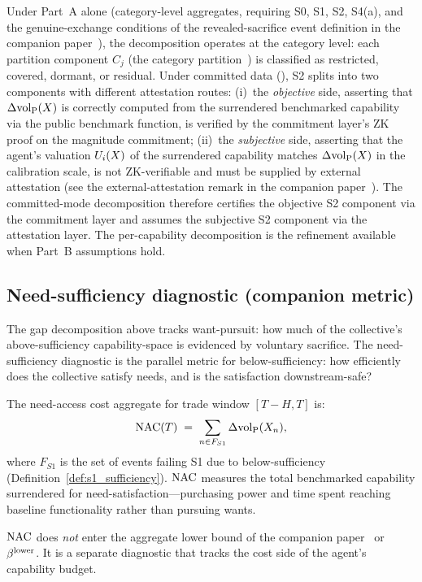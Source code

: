 \begin{remark}
Under Part~A alone (category-level aggregates, requiring S0,
S1, S2, S4(a), and the genuine-exchange conditions of the
revealed-sacrifice event definition in the companion
paper~\citep[Revealed~Sacrifice]{lasser2026paper8a}), the
decomposition operates at the category level: each partition
component $C_j$
(the category partition~\citep[Revealed~Sacrifice]{lasser2026paper8a}) is classified as
restricted, covered, dormant, or residual.  Under committed data
(\citep[Revealed~Sacrifice]{lasser2026paper8a}), S2 splits into
two components with different attestation routes: (i)~the
\emph{objective} side, asserting that $\Delta{\operatorname{vol}_{\mathrm{P}}}(X)$ is
correctly computed from the surrendered benchmarked capability
via the public benchmark function, is verified by the commitment
layer's ZK proof on the magnitude commitment; (ii)~the
\emph{subjective} side, asserting that the agent's valuation
$U_i(X)$ of the surrendered capability matches $\Delta{\operatorname{vol}_{\mathrm{P}}}(X)$
in the calibration scale, is not ZK-verifiable and must be
supplied by external attestation
(see the external-attestation remark in the companion
paper~\citep[Revealed~Sacrifice]{lasser2026paper8a}).
The committed-mode decomposition therefore certifies the
objective S2 component via the commitment layer and assumes the
subjective S2 component via the attestation layer.  The
per-capability decomposition is
the refinement available when Part~B assumptions hold.
\end{remark}

\subsection{Need-sufficiency diagnostic (companion metric)}
\label{sec:need_diagnostic}

The gap decomposition above tracks want-pursuit: how much of the
collective's above-sufficiency capability-space is evidenced by
voluntary sacrifice.  The need-sufficiency diagnostic is the
parallel metric for below-sufficiency: how efficiently does the
collective satisfy needs, and is the satisfaction downstream-safe?

\begin{definition}
\label{def:nac}
The need-access cost aggregate for trade window $[T - H, T]$ is:
\[
  \mathrm{NAC}(T) \;=\; \sum_{n \in F_{S1}}
  \Delta{\operatorname{vol}_{\mathrm{P}}}(X_n),
\]
where $F_{S1}$ is the set of events failing S1 due to
below-sufficiency (Definition~\ref{def:s1_sufficiency}).
$\mathrm{NAC}$ measures the total benchmarked capability surrendered for
need-satisfaction---purchasing power and time spent reaching
baseline functionality rather than pursuing wants.

$\mathrm{NAC}$ does \emph{not} enter
the aggregate lower bound of the companion
paper~\citep[Revealed~Sacrifice]{lasser2026paper8a} or
$\beta^{\mathrm{lower}}$.  It is a separate diagnostic that tracks the cost side
of the agent's capability budget.
\end{definition}

